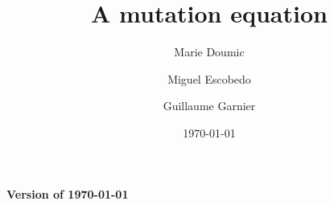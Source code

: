 \documentclass[11pt]{amsart}
\title{A mutation equation}
\author{Marie Doumic \and Miguel Escobedo \and Guillaume Garnier}
\date{\today}
\renewcommand{\Re}{\mathfrak{R}e}
\newcommand{\supp}{\mathrm{supp}\,}
\begin{document}
\maketitle
\begin{center}
    \textbf{Version of \today}
\end{center}

\tableofcontents





    
    
\end{document}
